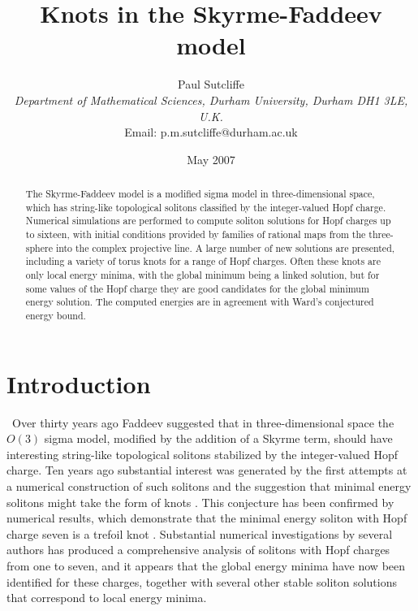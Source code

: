 \documentclass[12pt]{article}
\newcommand{\news}{\setcounter{equation}{0}}
\begin{document}
\title{
\vskip 2cm Knots in the Skyrme-Faddeev model}
\author{Paul Sutcliffe\\[10pt]
{\em \normalsize Department of Mathematical Sciences,
Durham University, Durham DH1 3LE, U.K.}\\
{\normalsize Email: p.m.sutcliffe@durham.ac.uk}}
\date{May 2007}
\maketitle
\begin{abstract}
The Skyrme-Faddeev model is a modified sigma model in
three-dimensional space, which has string-like topological solitons
classified by the integer-valued Hopf charge. Numerical simulations
are performed to compute soliton solutions for Hopf charges up to
sixteen, with initial conditions provided by families of rational
maps from the three-sphere into the complex projective line. A large
number of new solutions are presented, including a variety of torus
knots for a range of Hopf charges. Often these knots are only local
energy minima, with the global minimum being a linked solution, but
for some values of the Hopf charge they are good candidates
for the global minimum energy solution. The computed energies are in
agreement with Ward's conjectured energy bound.
\end{abstract}

\newpage
\section{Introduction}\news

\ \quad Over thirty years ago Faddeev suggested \cite{Fa2} that in
three-dimensional space the $O(3)$ sigma model, modified by the
addition of a Skyrme term, should have interesting string-like
topological solitons stabilized by the integer-valued Hopf charge.
Ten years ago substantial interest was generated by the first
attempts at a numerical construction of such solitons \cite{FN, GH}
and the suggestion that minimal energy solitons might take the form
of knots \cite{FN}. This conjecture has been confirmed by numerical
results, which demonstrate that the minimal energy soliton with Hopf
charge seven is a trefoil knot \cite{BS5}. Substantial numerical
investigations by several authors \cite{FN,GH,BS5,HS,HS2,Wa5} has
produced a comprehensive analysis of solitons with Hopf charges from
one to seven, and it appears that the global energy minima have now
been identified for these charges, together with several other
stable soliton solutions that correspond to local energy minima.
\end{document}
